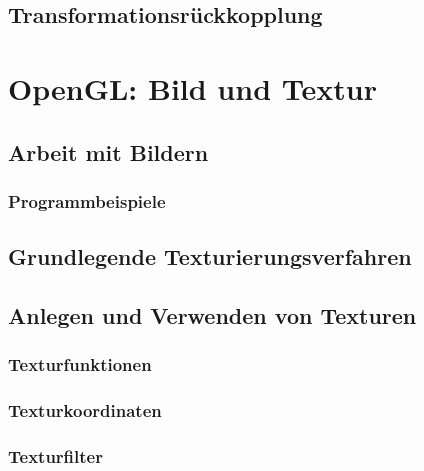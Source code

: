 \section{Transformationsrückkopplung}

\chapter{OpenGL: Bild und Textur}

\section{Arbeit mit Bildern}

\subsection{Programmbeispiele}

\section{Grundlegende Texturierungsverfahren}

\section{Anlegen und Verwenden von Texturen}

\subsection{Texturfunktionen}

\subsection{Texturkoordinaten}

\subsection{Texturfilter}

